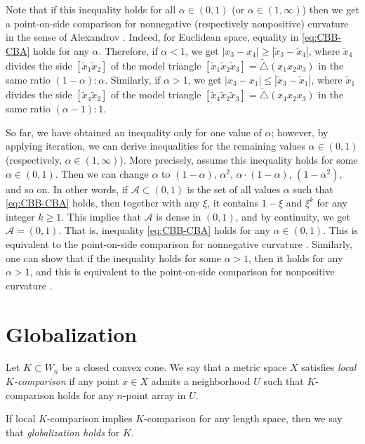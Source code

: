 Note that if this inequality holds for all $\alpha\in (0,1)$ (or $\alpha\in (1,\infty)$) then we get
a point-on-side comparison for nonnegative (respectively nonpositive) curvature in the sense of Alexandrov \cite[8.14 and 9.14]{AKP-2024}.
Indeed, for Euclidean space, equality in \ref{eq:CBB-CBA} holds for any $\alpha$.
Therefore, if $\alpha<1$, we get $|x_3-x_4|\geqslant |\tilde x_3-\tilde x_4|$, where $\tilde x_4$ divides the side $[\tilde x_1\tilde x_2]$ of the model triangle $[\tilde x_1\tilde x_2\tilde x_3]=\tilde\triangle(x_1x_2x_3)$ in the same ratio $(1-\alpha):\alpha$.
Similarly, if $\alpha>1$, we get $|x_3-x_1|\leqslant |\tilde x_3-\tilde x_1|$, where $\tilde x_1$ divides the side $[\tilde x_4\tilde x_2]$ of the model triangle $[\tilde x_4\tilde x_2\tilde x_3]=\tilde\triangle(x_4x_2x_3)$ in the same ratio $(\alpha-1):1$.

So far, we have obtained an inequality only for one value of $\alpha$;
however, by applying iteration, we can derive inequalities for the remaining values $\alpha\in (0,1)$ (respectively, $\alpha\in (1,\infty)$).
More precisely, assume this inequality holds for some $\alpha\in (0,1)$.
Then we can change $\alpha$ to $(1-\alpha)$, $\alpha^2$,  $\alpha\cdot (1-\alpha)$, $(1-\alpha^2)$, and so on.
In other words, if $\mathcal{A}\subset(0,1)$ is the set of all values $\alpha$ such that \ref{eq:CBB-CBA} holds, then together with any $\xi$, it contains $1-\xi$ and $\xi^k$ for any integer $k\geqslant 1$.
This implies that $\mathcal{A}$ is dense in $(0,1)$, and by continuity, we get $\mathcal{A}=(0,1)$.
That is, inequality \ref{eq:CBB-CBA} holds for any $\alpha\in (0,1)$.
This is equivalent to the point-on-side comparison for nonnegative curvature \cite[8.14]{AKP-2024}.
Similarly, one can show that if the inequality holds for some $\alpha>1$, then it holds for any $\alpha>1$,
and this is equivalent to the point-on-side comparison for nonpositive curvature \cite[9.14]{AKP-2024}.
\qeds

\section{Globalization}\label{par:globalization}

Let $K\subset W_n$ be a closed convex cone.
We say that a metric space $X$ satisfies \emph{local $K$-comparison} if any point $x\in X$ admits a neighborhood $U$ such that $K$-comparison holds for any $n$-point array in $U$.

If local $K$-comparison implies $K$-comparison for any length space, then we say that \emph{globalization holds} for $K$.

